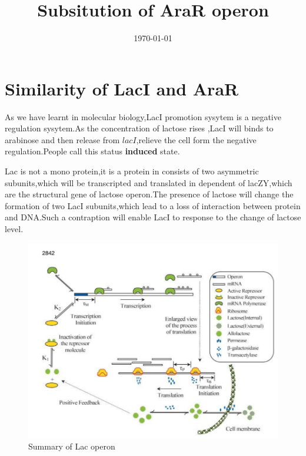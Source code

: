 \documentclass[a4paper,10pt,twocolumn]{article}
\title{Subsitution of AraR operon}
\date{\today}
\begin{document}
    \thispagestyle{firstpage}
    \maketitle
    \section{Similarity of LacI and AraR}
    As we have learnt in molecular biology,LacI promotion sysytem is a negative regulation sysytem.As the concentration of lactose rises ,LacI will binds to 
    arabinose and then release from $lacI$,relieve the cell form the negative regulation.People call this status \textbf{induced} state.\citep{Kuhlman2007}

    Lac is not a mono protein,it is a protein in consists of two asymmetric subunits,which will be transcripted and translated in dependent of lacZY,which are the 
    structural gene of lactose operon.The presence of lactose will change the formation of two LacI subunits,which lead to a loss of interaction between protein 
    and DNA.Such a contraption will enable LacI to response to the change of lactose level.
    \begin{figure}
        \includegraphics[width=\linewidth]{Picture/lac.png} %
        \caption{Summary of Lac operon} %
        \label{lac} %
    \end{figure}
    
\end{document}
